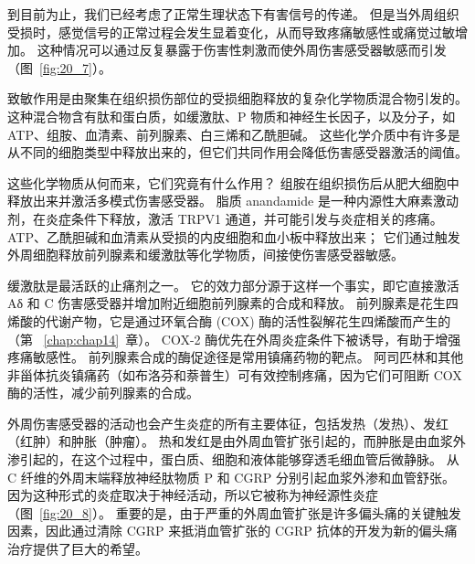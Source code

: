 到目前为止，我们已经考虑了正常生理状态下有害信号的传递。
但是当外周组织受损时，感觉信号的正常过程会发生显着变化，从而导致疼痛敏感性或痛觉过敏增加。
这种情况可以通过反复暴露于伤害性刺激而使外周伤害感受器敏感而引发（图~\ref{fig:20_7}）。


致敏作用是由聚集在组织损伤部位的受损细胞释放的复杂化学物质混合物引发的。
这种混合物含有肽和蛋白质，如缓激肽、P 物质和神经生长因子，以及分子，如 ATP、组胺、血清素、前列腺素、白三烯和乙酰胆碱。
这些化学介质中有许多是从不同的细胞类型中释放出来的，但它们共同作用会降低伤害感受器激活的阈值。


这些化学物质从何而来，它们究竟有什么作用？
组胺在组织损伤后从肥大细胞中释放出来并激活多模式伤害感受器。
脂质 anandamide 是一种内源性大麻素激动剂，在炎症条件下释放，激活 TRPV1 通道，并可能引发与炎症相关的疼痛。
ATP、乙酰胆碱和血清素从受损的内皮细胞和血小板中释放出来；
它们通过触发外周细胞释放前列腺素和缓激肽等化学物质，间接使伤害感受器敏感。


缓激肽是最活跃的止痛剂之一。
它的效力部分源于这样一个事实，即它直接激活 Aδ 和 C 伤害感受器并增加附近细胞前列腺素的合成和释放。
前列腺素是花生四烯酸的代谢产物，它是通过环氧合酶 (COX) 酶的活性裂解花生四烯酸而产生的（第 ~\ref{chap:chap14}~章）。
COX-2 酶优先在外周炎症条件下被诱导，有助于增强疼痛敏感性。
前列腺素合成的酶促途径是常用镇痛药物的靶点。
阿司匹林和其他非甾体抗炎镇痛药（如布洛芬和萘普生）可有效控制疼痛，因为它们可阻断 COX 酶的活性，减少前列腺素的合成。


外周伤害感受器的活动也会产生炎症的所有主要体征，包括发热（发热）、发红（红肿）和肿胀（肿瘤）。
热和发红是由外周血管扩张引起的，而肿胀是由血浆外渗引起的，在这个过程中，蛋白质、细胞和液体能够穿透毛细血管后微静脉。
从 C 纤维的外周末端释放神经肽物质 P 和 CGRP 分别引起血浆外渗和血管舒张。
因为这种形式的炎症取决于神经活动，所以它被称为神经源性炎症（图~\ref{fig:20_8}）。
重要的是，由于严重的外周血管扩张是许多偏头痛的关键触发因素，因此通过清除 CGRP 来抵消血管扩张的 CGRP 抗体的开发为新的偏头痛治疗提供了巨大的希望。


